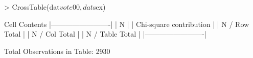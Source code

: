 \begin{Schunk}
\begin{Sinput}
> CrossTable(dat$vote00, dat$sex)
\end{Sinput}
\begin{Soutput}
   Cell Contents
|-------------------------|
|                       N |
| Chi-square contribution |
|           N / Row Total |
|           N / Col Total |
|         N / Table Total |
|-------------------------|

 
Total Observations in Table:  2930 
 
\end{Soutput}
\end{Schunk}
